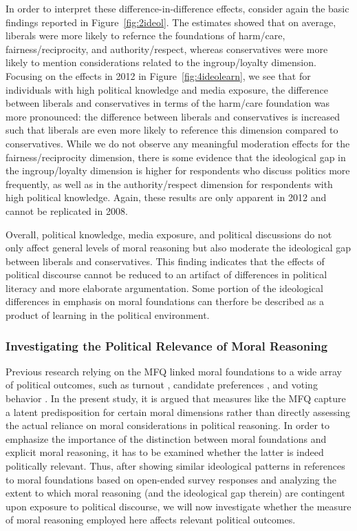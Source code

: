 \documentclass[12pt]{article}
\begin{document}
In order to interpret these difference-in-difference effects, consider again the basic findings reported in Figure~\ref{fig:2ideol}. The estimates showed that on average, liberals were more likely to refernce the foundations of harm/care, fairness/reciprocity, and authority/respect, whereas conservatives were more likely to mention considerations related to the ingroup/loyalty dimension. Focusing on the effects in 2012 in Figure~\ref{fig:4ideolearn}, we see that for individuals with high political knowledge and media exposure, the difference between liberals and conservatives in terms of the harm/care foundation was more pronounced: the difference between liberals and conservatives is increased such that liberals are even more likely to reference this dimension compared to conservatives. While we do not observe any meaningful moderation effects for the fairness/reciprocity dimension, there is some evidence that the ideological gap in the ingroup/loyalty dimension is higher for respondents who discuss politics more frequently, as well as in the authority/respect dimension for respondents with high political knowledge. Again, these results are only apparent in 2012 and cannot be replicated in 2008.

Overall, political knowledge, media exposure, and political discussions do not only affect general levels of moral reasoning but also moderate the ideological gap between liberals and conservatives. This finding indicates that the effects of political discourse cannot be reduced to an artifact of differences in political literacy and more elaborate argumentation. Some portion of the ideological differences in emphasis on moral foundations can therfore be described as a product of learning in the political environment.


\subsubsection{Investigating the Political Relevance of Moral Reasoning}

Previous research relying on the MFQ linked moral foundations to a wide array of political outcomes, such as turnout \citep{johnson2014ideology}, candidate preferences \citep{iyer2010beyond}, and voting behavior \citep{franks2015using}. In the present study, it is argued that measures like the MFQ capture a latent predisposition for certain moral dimensions rather than directly assessing the actual reliance on moral considerations in political reasoning. In order to emphasize the importance of the distinction between moral foundations and explicit moral reasoning, it has to be examined whether the latter is indeed politically relevant. Thus, after showing similar ideological patterns in references to moral foundations based on open-ended survey responses and analyzing the extent to which moral reasoning (and the ideological gap therein) are contingent upon exposure to political discourse, we will now investigate whether the measure of moral reasoning employed here affects relevant political outcomes.
\end{document}
